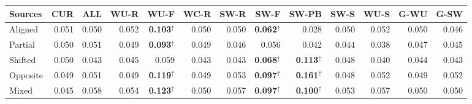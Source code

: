 \begin{tabular}{@{}lrrrrrrrrrrrr@{}}
\toprule
Sources & CUR & ALL & WU-R & WU-F & WC-R & SW-R & SW-F & SW-PB & SW-S & WU-S & G-WU & G-SW\\
\midrule
Aligned & 0.051 & 0.050 & 0.052 & \textbf{0.103}$^{\uparrow}$ & 0.050 & 0.050 & \textbf{0.062}$^{\uparrow}$ & 0.028 & 0.050 & 0.052 & 0.050 & 0.046\\
Partial & 0.050 & 0.051 & 0.049 & \textbf{0.093}$^{\uparrow}$ & 0.049 & 0.046 & 0.056 & 0.042 & 0.044 & 0.038 & 0.047 & 0.045\\
Shifted & 0.050 & 0.043 & 0.045 & 0.059 & 0.043 & 0.043 & \textbf{0.068}$^{\uparrow}$ & \textbf{0.113}$^{\uparrow}$ & 0.048 & 0.040 & 0.044 & 0.043\\
Opposite & 0.049 & 0.051 & 0.049 & \textbf{0.119}$^{\uparrow}$ & 0.049 & 0.053 & \textbf{0.097}$^{\uparrow}$ & \textbf{0.161}$^{\uparrow}$ & 0.048 & 0.052 & 0.049 & 0.052\\
Mixed & 0.045 & 0.058 & 0.054 & \textbf{0.123}$^{\uparrow}$ & 0.050 & 0.057 & \textbf{0.097}$^{\uparrow}$ & \textbf{0.100}$^{\uparrow}$ & 0.053 & 0.057 & 0.050 & 0.050\\
\bottomrule
\end{tabular}